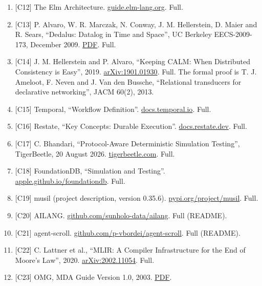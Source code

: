 \documentclass[10pt,letterpaper]{article}
\begin{document}
\begin{enumerate}
  \href{https://martinfowler.com/eaaDev/EventSourcing.html}{martinfowler.com}.
  Full.
\item
  {[}C12{]} The Elm Architecture.
  \href{https://guide.elm-lang.org/architecture/}{guide.elm-lang.org}.
  Full.
\item
  {[}C13{]} P. Alvaro, W. R. Marczak, N. Conway, J. M. Hellerstein, D.
  Maier and R. Sears, ``Dedalus: Datalog in Time and Space'', UC
  Berkeley EECS-2009-173, December 2009.
  \href{https://www2.eecs.berkeley.edu/Pubs/TechRpts/2009/EECS-2009-173.pdf}{PDF}.
  Full.
\item
  {[}C14{]} J. M. Hellerstein and P. Alvaro, ``Keeping CALM: When
  Distributed Consistency is Easy'', 2019.
  \href{https://arxiv.org/abs/1901.01930}{arXiv:1901.01930}. Full. The
  formal proof is T. J. Ameloot, F. Neven and J. Van den Bussche,
  ``Relational transducers for declarative networking'', JACM 60(2),
  2013.
\item
  {[}C15{]} Temporal, ``Workflow Definition''.
  \href{https://docs.temporal.io/workflow-definition}{docs.temporal.io}.
  Full.
\item
  {[}C16{]} Restate, ``Key Concepts: Durable Execution''.
  \href{https://docs.restate.dev/foundations/key-concepts\#durable-execution}{docs.restate.dev}.
  Full.
\item
  {[}C17{]} C. Bhandari, ``Protocol-Aware Deterministic Simulation
  Testing'', TigerBeetle, 20 August 2026.
  \href{https://tigerbeetle.com/blog/2026-08-20-protocol-aware-dst/}{tigerbeetle.com}.
  Full.
\item
  {[}C18{]} FoundationDB, ``Simulation and Testing''.
  \href{https://apple.github.io/foundationdb/testing.html}{apple.github.io/foundationdb}.
  Full.
\item
  {[}C19{]} musil (project description, version 0.35.6).
  \href{https://pypi.org/project/musil/}{pypi.org/project/musil}. Full.
\item
  {[}C20{]} AILANG.
  \href{https://github.com/sunholo-data/ailang}{github.com/sunholo-data/ailang}.
  Full (README).
\item
  {[}C21{]} agent-scroll.
  \href{https://github.com/p-vbordei/agent-scroll}{github.com/p-vbordei/agent-scroll}.
  Full (README).
\item
  {[}C22{]} C. Lattner et al., ``MLIR: A Compiler Infrastructure for the
  End of Moore's Law'', 2020.
  \href{https://arxiv.org/abs/2002.11054}{arXiv:2002.11054}. Full.
\item
  {[}C23{]} OMG, MDA Guide Version 1.0, 2003.
  \href{https://www.omg.org/mda/mda_files/MDA_Guide_Version1-0.pdf}{PDF}.

\end{enumerate}
\end{document}
